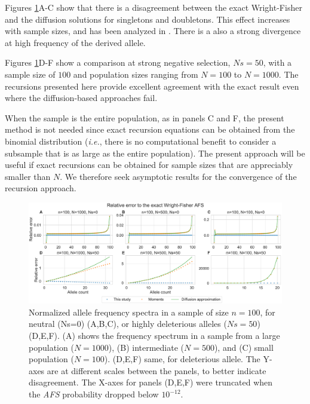 \documentclass[review,nonatbib]{elsarticle}
\begin{document}
Figures \ref{fig_strong-selection}A-C show that there is a disagreement between the exact
Wright-Fisher and the diffusion solutions for singletons and doubletons. This effect increases with sample sizes, 
and has been analyzed in \citep{BhaskarEtAl2014}. There is a also
a strong divergence at high frequency of the derived allele. %

Figures \ref{fig_strong-selection}D-F show a comparison at strong negative selection, $Ns=50$, with a
sample size of $100$ and population sizes ranging from $N=100$ to  $N=1000.$  
The recursions presented here provide excellent agreement with the exact result even 
where the diffusion-based approaches fail. 

When the sample is the entire population, as in panels C and F, the present method is not needed since
exact recursion equations can be obtained from the binomial distribution 
(\textit{i.e.}, there is no computational benefit to consider a subsample that is as large as the entire population). 
The present approach will be useful if exact recursions can be obtained for sample sizes that are appreciably smaller
than $N$. We therefore seek asymptotic results for the convergence of the recursion approach.

\begin{figure}
  \centering
  \includegraphics[width=0.7\textheight]{fig/strong_selection_six_panel.pdf}
  \caption{Normalized allele frequency spectra in a sample of size $n=100$, for neutral (Ns=0)
    (A,B,C), or highly deleterious alleles ($Ns=50$) (D,E,F). (A) shows the frequency spectrum in a
    sample from a large population ($N=1000$), (B) intermediate ($N=500$), and (C) small population
    ($N=100$). (D,E,F) same, for deleterious allele. The Y-axes are at different scales between the
    panels, to better indicate disagreement. The X-axes for panels (D,E,F) were truncated
    when the \textit{AFS} probability dropped below $10^{-12}$. }
  \label{fig_strong-selection}
\end{figure}
\end{document}
